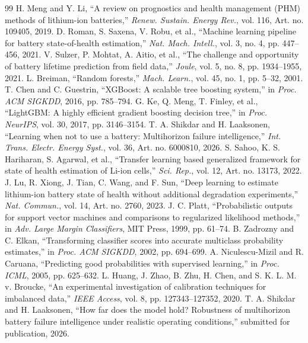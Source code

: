\documentclass[preprint,12pt]{elsarticle}
\begin{document}
\begin{thebibliography}{99}
 H. Meng and Y. Li, ``A review on prognostics and health management (PHM) methods of lithium-ion batteries,'' \emph{Renew. Sustain. Energy Rev.}, vol. 116, Art. no. 109405, 2019.
 D. Roman, S. Saxena, V. Robu, et al., ``Machine learning pipeline for battery state-of-health estimation,'' \emph{Nat. Mach. Intell.}, vol. 3, no. 4, pp. 447--456, 2021.
 V. Sulzer, P. Mohtat, A. Aitio, et al., ``The challenge and opportunity of battery lifetime prediction from field data,'' \emph{Joule}, vol. 5, no. 8, pp. 1934--1955, 2021.
 L. Breiman, ``Random forests,'' \emph{Mach. Learn.}, vol. 45, no. 1, pp. 5--32, 2001.
 T. Chen and C. Guestrin, ``XGBoost: A scalable tree boosting system,'' in \emph{Proc. ACM SIGKDD}, 2016, pp. 785--794.
 G. Ke, Q. Meng, T. Finley, et al., ``LightGBM: A highly efficient gradient boosting decision tree,'' in \emph{Proc. NeurIPS}, vol. 30, 2017, pp. 3146--3154.
 T. A. Shikdar and H. Laaksonen, ``Learning when not to use a battery: Multihorizon failure intelligence,'' \emph{Int. Trans. Electr. Energy Syst.}, vol. 36, Art. no. 6000810, 2026.
 S. Sahoo, K. S. Hariharan, S. Agarwal, et al., ``Transfer learning based generalized framework for state of health estimation of Li-ion cells,'' \emph{Sci. Rep.}, vol. 12, Art. no. 13173, 2022.
 J. Lu, R. Xiong, J. Tian, C. Wang, and F. Sun, ``Deep learning to estimate lithium-ion battery state of health without additional degradation experiments,'' \emph{Nat. Commun.}, vol. 14, Art. no. 2760, 2023.
 J. C. Platt, ``Probabilistic outputs for support vector machines and comparisons to regularized likelihood methods,'' in \emph{Adv. Large Margin Classifiers}, MIT Press, 1999, pp. 61--74.
 B. Zadrozny and C. Elkan, ``Transforming classifier scores into accurate multiclass probability estimates,'' in \emph{Proc. ACM SIGKDD}, 2002, pp. 694--699.
 A. Niculescu-Mizil and R. Caruana, ``Predicting good probabilities with supervised learning,'' in \emph{Proc. ICML}, 2005, pp. 625--632.
 L. Huang, J. Zhao, B. Zhu, H. Chen, and S. K. L. M. v. Broucke, ``An experimental investigation of calibration techniques for imbalanced data,'' \emph{IEEE Access}, vol. 8, pp. 127343--127352, 2020.
 T. A. Shikdar and H. Laaksonen, ``How far does the model hold? Robustness of multihorizon battery failure intelligence under realistic operating conditions,'' submitted for publication, 2026.

\end{thebibliography}
\end{document}
